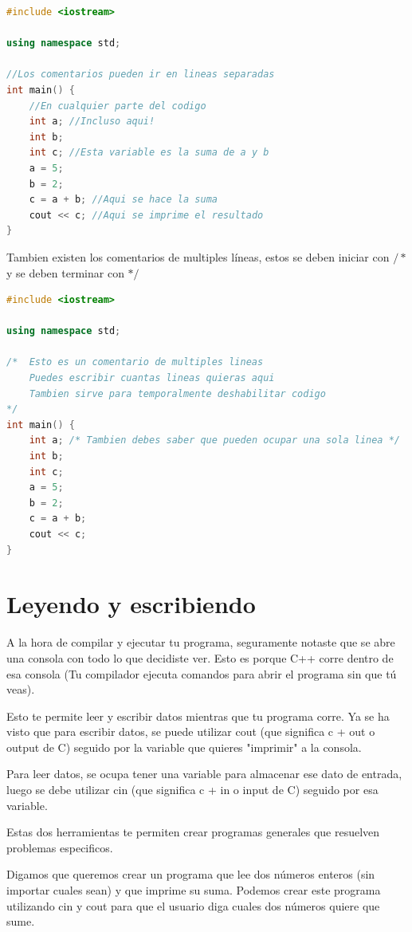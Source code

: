 \documentclass{article}
\begin{document}
\begin{lstlisting}[language=C++, caption=Comentario]
#include <iostream>

using namespace std;

//Los comentarios pueden ir en lineas separadas
int main() {
    //En cualquier parte del codigo
    int a; //Incluso aqui!
    int b; 
    int c; //Esta variable es la suma de a y b
    a = 5;
    b = 2;
    c = a + b; //Aqui se hace la suma
    cout << c; //Aqui se imprime el resultado
}
\end{lstlisting}

Tambien existen los comentarios de multiples líneas, estos se deben iniciar con $/*$ y se deben terminar con $*/$

\begin{lstlisting}[language=C++, caption=Comentario]
#include <iostream>

using namespace std;

/*  Esto es un comentario de multiples lineas
    Puedes escribir cuantas lineas quieras aqui
    Tambien sirve para temporalmente deshabilitar codigo
*/
int main() {
    int a; /* Tambien debes saber que pueden ocupar una sola linea */
    int b; 
    int c;
    a = 5;
    b = 2;
    c = a + b;
    cout << c;
}
\end{lstlisting}

\section{Leyendo y escribiendo}

A la hora de compilar y ejecutar tu programa, seguramente notaste que se abre una consola con todo lo que decidiste ver. Esto es porque C++ corre dentro de esa consola (Tu compilador ejecuta comandos para abrir el programa sin que tú veas).

Esto te permite leer y escribir datos mientras que tu programa corre. Ya se ha visto que para escribir datos, se puede utilizar cout (que significa c + out o output de C) seguido por la variable que quieres "imprimir" a la consola.

Para leer datos, se ocupa tener una variable para almacenar ese dato de entrada, luego se debe utilizar cin (que significa c + in o input de C) seguido por esa variable.

Estas dos herramientas te permiten crear programas generales que resuelven problemas especificos.

Digamos que queremos crear un programa que lee dos números enteros (sin importar cuales sean) y que imprime su suma. Podemos crear este programa utilizando cin y cout para que el usuario diga cuales dos números quiere que sume.
\end{document}
